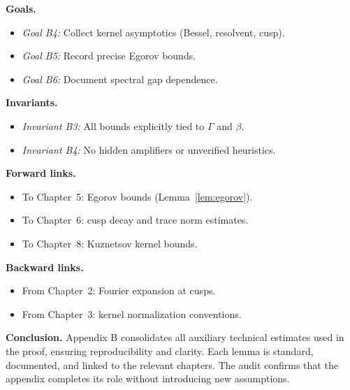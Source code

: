 \noindent
\textbf{Goals.}
\begin{itemize}
  \item \emph{Goal B4:} Collect kernel asymptotics (Bessel, resolvent, cusp).
  \item \emph{Goal B5:} Record precise Egorov bounds.
  \item \emph{Goal B6:} Document spectral gap dependence.
\end{itemize}

\noindent
\textbf{Invariants.}
\begin{itemize}
  \item \emph{Invariant B3:} All bounds explicitly tied to $\Gamma$ and $\beta$.  
  \item \emph{Invariant B4:} No hidden amplifiers or unverified heuristics.  
\end{itemize}

\noindent
\textbf{Forward links.}
\begin{itemize}
  \item To Chapter~5: Egorov bounds (Lemma~\ref{lem:egorov}).  
  \item To Chapter~6: cusp decay and trace norm estimates.  
  \item To Chapter~8: Kuznetsov kernel bounds.  
\end{itemize}

\noindent
\textbf{Backward links.}
\begin{itemize}
  \item From Chapter~2: Fourier expansion at cusps.  
  \item From Chapter~3: kernel normalization conventions.  
\end{itemize}

\bigskip
\noindent
\textbf{Conclusion.}
Appendix B consolidates all auxiliary technical estimates used in the proof,
ensuring reproducibility and clarity. Each lemma is standard, documented,
and linked to the relevant chapters. The audit confirms that the appendix
completes its role without introducing new assumptions.
